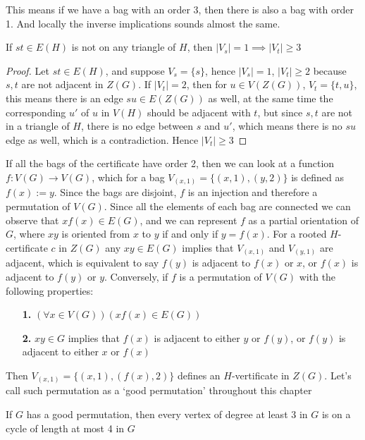 This means if we have a bag with an order 3, then there is also a bag with order 1.
And locally the inverse implications sounds almost the same.

\begin{claim}
    \label{claim:first}
    If $st \in E(H)$ is not on any triangle of $H$, then $|V_{s}| = 1 \implies |V_{t}| \geq 3$ 
\end{claim}

\begin{proof}
    Let $st \in E(H)$, and suppose $V_{s} = \{s\}$, hence $|V_{s}| = 1$, $|V_{t}| \geq 2$ because $s, t$ are not adjacent in $Z(G)$.
    If $|V_{t}| = 2$, then for $u \in V(Z(G))$, $V_{t} = \{t, u\}$, this means there is an edge $su \in E(Z(G))$ as well, at the same time 
    the corresponding $u'$ of $u$ in $V(H)$ should be adjacent with $t$, but since $s, t$ are not in a triangle of $H$, there is no edge
    between $s$ and $u'$, which means there is no $su$ edge as well, which is a contradiction. Hence $|V_{t}| \geq 3$
\end{proof}

If all the bags of the certificate have order 2, then we can look at a function $f: V(G) \to V(G)$, which for a bag $V_{(x, 1)} = \{(x, 1), (y, 2)\}$ is defined as $f(x) := y$.
Since the bags are disjoint, $f$ is an injection and therefore a permutation of $V(G)$. Since all the elements of each bag are connected we can observe
that $xf(x) \in E(G)$, and we can represent $f$ as a partial orientation of $G$, where $xy$ is oriented from $x$ to $y$ if and only if $y = f(x)$. 
For a rooted $H$-certificate $c$ in $Z(G)$ any $xy \in E(G)$ implies that $V_{(x, 1)}$ and $V_{(y, 1)}$ are adjacent, which is equivalent to say
$f(y)$ is adjacent to $f(x)$ or $x$, or $f(x)$ is adjacent to $f(y)$ or $y$. Conversely, if $f$ is a permutation of $V(G)$ with the following properties:

\begin{itemize}
    \item [\textbf{1.}] $(\forall x \in V(G)) (xf(x) \in E(G))$ 
    \item [\textbf{2.}] $xy \in G$ implies that $f(x)$ is adjacent to either $y$ or $f(y)$, or $f(y)$ is adjacent to either $x$ or $f(x)$
\end{itemize}
Then $V_{(x, 1)} = \{(x, 1), (f(x), 2)\}$ defines an $H$-vertificate in $Z(G)$.
Let's call such permutation as a `good permutation' throughout this chapter

\begin{claim}
    \label{claim:second}
    If $G$ has a good permutation, then every vertex of degree at least 3 in $G$ is on a cycle of length at most 4 in $G$
\end{claim}


